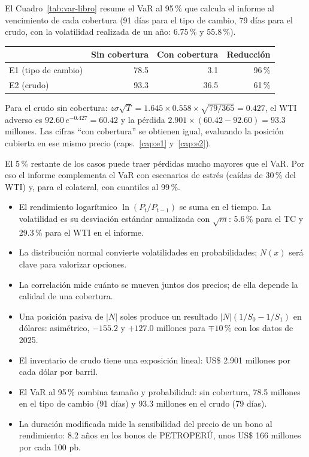 \begin{informe}
El Cuadro~\ref{tab:var-libro} resume el VaR al 95\,\% que calcula el informe al vencimiento de cada cobertura (91 días para el tipo de cambio, 79 días para el crudo, con la volatilidad realizada de un año: 6.75\,\% y 55.8\,\%).

\begin{center}\small
{}\label{tab:var-libro}
\begin{tabular}{@{}lrrr@{}}
\toprule
& Sin cobertura & Con cobertura & Reducción\\
\midrule
E1 (tipo de cambio) & 78.5 & 3.1 & 96\,\%\\
E2 (crudo) & 93.3 & 36.5 & 61\,\%\\
\bottomrule
\end{tabular}
\end{center}
Para el crudo sin cobertura: $z\sigma\sqrt T=1.645\times0.558\times\sqrt{79/365}=0.427$, el WTI adverso es $92.60\,e^{-0.427}=60.42$ y la pérdida $2.901\times(60.42-92.60)=93.3$ millones. Las cifras \enquote{con cobertura} se obtienen igual, evaluando la posición cubierta en ese mismo precio (caps.~\ref{cap:e1} y~\ref{cap:e2}).
\end{informe}

\begin{cuidado}
El 5\,\% restante de los casos puede traer pérdidas mucho mayores que el VaR. Por eso el informe complementa el VaR con escenarios de estrés (caídas de 30\,\% del WTI) y, para el colateral, con cuantiles al 99\,\%.
\end{cuidado}

\begin{resumen}
\begin{itemize}
\item El rendimiento logarítmico $\ln(P_t/P_{t-1})$ se suma en el tiempo. La volatilidad es su desviación estándar anualizada con $\sqrt{m}$: 5.6\,\% para el TC y 29.3\,\% para el WTI en el informe.
\item La distribución normal convierte volatilidades en probabilidades; $N(x)$ será clave para valorizar opciones.
\item La correlación mide cuánto se mueven juntos dos precios; de ella depende la calidad de una cobertura.
\item Una posición pasiva de $|N|$ soles produce un resultado $|N|(1/S_0-1/S_1)$ en dólares: asimétrico, $-155.2$ y $+127.0$ millones para $\mp10\,\%$ con los datos de 2025.
\item El inventario de crudo tiene una exposición lineal: US\$ 2.901 millones por cada dólar por barril.
\item El VaR al 95\,\% combina tamaño y probabilidad: sin cobertura, 78.5 millones en el tipo de cambio (91 días) y 93.3 millones en el crudo (79 días).
\item La duración modificada mide la sensibilidad del precio de un bono al rendimiento: 8.2 años en los bonos de PETROPERÚ, unos US\$ 166 millones por cada 100 pb.
\end{itemize}
\end{resumen}

